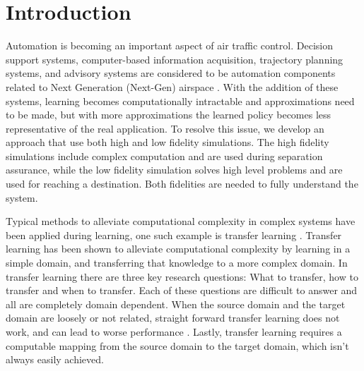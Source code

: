 \documentclass{sig-alternate}
\begin{document}
\begin{abstract}
\end{abstract}



\vspace{5mm}
\section{Introduction}

Automation is becoming an important aspect of air traffic control. Decision support systems, computer-based information acquisition, trajectory planning systems, and advisory systems are considered to be automation components related to Next Generation (Next-Gen) airspace \cite{next-gen}. With the addition of these systems, learning becomes computationally intractable and approximations need to be made, but with more approximations the learned policy becomes less representative of the real application. To resolve this issue, we develop an approach that use both high and low fidelity simulations. The high fidelity simulations include complex computation and are used during separation assurance, while the low fidelity simulation solves high level problems and are used for reaching a destination. Both fidelities are needed to fully understand the system.

Typical methods to alleviate computational complexity in complex systems have been applied during learning, one such example is transfer learning \cite{Pan:2010:STL:1850483.1850545}. Transfer learning has been shown to alleviate computational complexity by learning in a simple domain, and transferring that knowledge to a more complex domain. In transfer learning there are three key research questions: What to transfer, how to transfer and when to transfer. Each of these questions are difficult to answer and all are completely domain dependent. When the source domain and the target domain are loosely or not related, straight forward transfer learning does not work, and can lead to worse performance \cite{Pan:2010:STL:1850483.1850545}. Lastly, transfer learning requires a computable mapping from the source domain to the target domain, which isn't always easily achieved.
\end{document}
